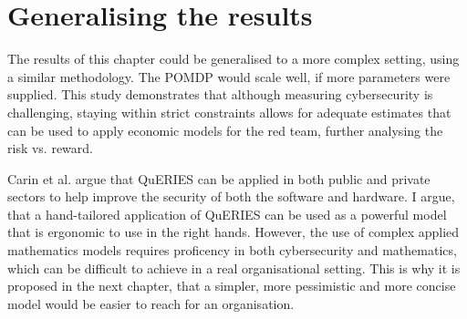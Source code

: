 \section{Generalising the results}

The results of this chapter could be generalised to a more complex
setting, using a similar methodology. The POMDP would scale well, if
more parameters were supplied. This study demonstrates that although
measuring cybersecurity is challenging, staying within strict
constraints allows for adequate estimates that can be used to apply
economic models for the red team, further analysing the risk vs. 
reward.
 
Carin et al. \cite{carin2008cybersecurity} argue that QuERIES can be
applied in both public and private sectors to help improve the
security of both the software and hardware. I argue, that a hand-tailored
application of QuERIES can be used as a powerful model that is
ergonomic to use in the right hands. However, the use of complex
applied mathematics models requires proficency in both cybersecurity and
mathematics, which can be difficult to achieve in a real organisational
setting. This is why it is proposed in the next chapter, that a simpler, more pessimistic and more concise model would be easier to reach for an
organisation.
